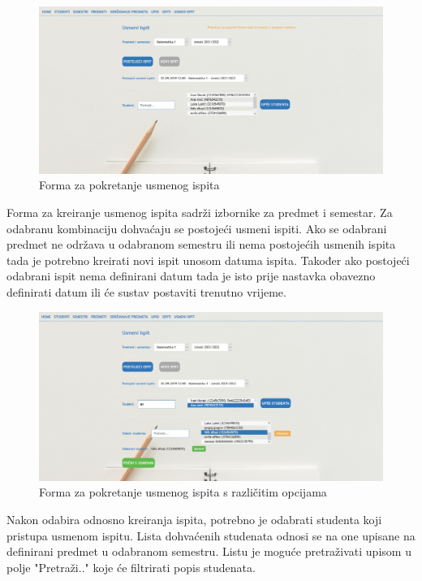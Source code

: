 \documentclass[times, utf8, diplomski]{fer}
\begin{document}
\begin{figure}[htb]
\centering
\includegraphics[width=14cm]{usmeni_before.jpg}
\caption{Forma za pokretanje usmenog ispita}
\label{fig:usmeni_forma}
\end{figure}

Forma za kreiranje usmenog ispita sadrži izbornike za predmet i semestar. Za odabranu kombinaciju dohvaćaju se postojeći usmeni ispiti. Ako se odabrani predmet ne održava u odabranom semestru ili nema postojećih usmenih ispita tada je potrebno kreirati novi ispit unosom datuma ispita. Također ako postojeći odabrani ispit nema definirani datum tada je isto prije nastavka obavezno definirati datum ili će sustav postaviti trenutno vrijeme.

\begin{figure}[htb]
\centering
\includegraphics[width=14cm]{usmeni_after_upisistudenta.jpg}
\caption{Forma za pokretanje usmenog ispita s različitim opcijama}
\label{fig:usmeni_forma2}
\end{figure}


Nakon odabira odnosno kreiranja ispita, potrebno je odabrati studenta koji pristupa usmenom ispitu. Lista dohvaćenih studenata odnosi se na one upisane na definirani predmet u odabranom semestru. Listu je moguće pretraživati upisom u polje "Pretraži.." koje će filtrirati popis studenata. 
\end{document}
